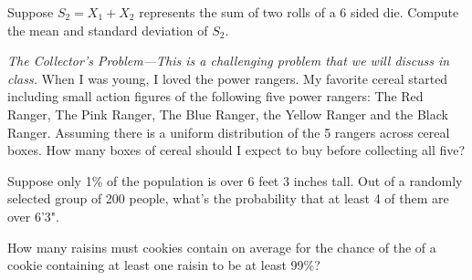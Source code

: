 \documentclass[addpoints,12pt]{exam}
\begin{document}
\begin{questions}
 \noaddpoints
{}
\addpoints

\question Suppose $S_2=X_1 + X_2$ represents the sum of two rolls of a 6 sided die. Compute the mean and standard deviation of $S_2$.

\vspace{1.3in}

\newpage
\question \emph{The Collector's Problem---This is a challenging problem that we will discuss in class.}
When I was young, I loved the power rangers. My favorite cereal started including small action figures of the following five power rangers: The Red Ranger, The Pink Ranger, The Blue Ranger, the Yellow Ranger and the Black Ranger. Assuming there is a uniform distribution of the 5 rangers across cereal boxes. How many boxes of cereal should I expect to buy before collecting all five?

\vspace{3in}



\question Suppose only 1\% of the population is over 6 feet 3 inches tall. Out of a randomly selected group of 200 people, what's the probability that at least 4 of them are over 6'3".

\vspace{1.5in}

\question How many raisins must cookies contain on average for the chance of the of a cookie containing at least one raisin to be at least 99\%?



\end{questions}
\end{document}
